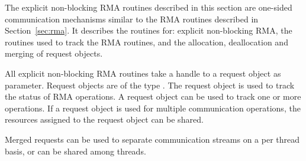The explicit non-blocking \ac{RMA} routines described in this section are
one-sided communication mechanisms similar to the \ac{RMA} routines
described in Section~\ref{sec:rma}.
It describes the routines for: explicit non-blocking \ac{RMA},
the routines used to track the \ac{RMA} routines, and the
allocation, deallocation and merging of request objects.

All explicit non-blocking \ac{RMA} routines take a handle to a request
object as parameter. Request objects are of the type
. The request object is used to track the
status of \ac{RMA} operations. A request object can be used to track one
or more operations. If a request object is used for multiple
communication operations, the resources assigned to the request object
can be shared.

Merged requests can be used to separate communication
streams on a per thread basis, or can be shared among threads.
